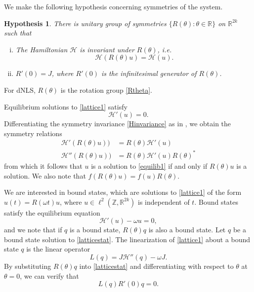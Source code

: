 \documentclass[12pt]{article}
\def\R{{\mathbb R}}
\def\Z{{\mathbb Z}}
\newtheorem{hypothesis}{Hypothesis}
\begin{document}
We make the following hypothesis concerning symmetries of the system.
\begin{hypothesis}\label{symmetryhyp}
There is unitary group of symmetries $\{ R(\theta) : \theta \in \R \}$ on $\R^{2k}$ such that 
\begin{enumerate}[(i)]
\item The Hamiltonian $\mathcal{H}$ is invariant under $R(\theta)$, i.e. 
\begin{equation}\label{Hinvariance}
\mathcal{H}(R(\theta)u) = \mathcal{H}(u).
\end{equation}
\item $R'(0) = J$, where $R'(0)$ is the infinitesimal generator of $R(\theta)$.
\end{enumerate}
\end{hypothesis}
\noindent For dNLS, $R(\theta)$ is the rotation group \eqref{Rtheta}.

Equilibrium solutions to \eqref{lattice1} satisfy 
\begin{equation}\label{equilib1}
\mathcal{H}'(u) = 0.
\end{equation}
Differentiating the symmetry invariance \eqref{Hinvariance} as in \cite{Grillakis1987}, we obtain the symmetry relations
\begin{equation}\label{symmetryrel}
\begin{aligned}
\mathcal{H}'(R(\theta)u)) &= R(\theta) \mathcal{H}'(u) \\
\mathcal{H}''(R(\theta)u)) &= R(\theta) \mathcal{H}'(u) R(\theta)^*
\end{aligned}
\end{equation}
from which it follows that $u$ is a solution to \eqref{equilib1} if and only if $R(\theta)u$ is a solution. We also note that $f(R(\theta)u) = f(u)R(\theta)$.

We are interested in bound states, which are solutions to \eqref{lattice1} of the form $u(t) = R(\omega t)u$, where $u \in \ell^2(\Z, \R^{2k})$ is independent of $t$. Bound states satisfy the equilibrium equation
\begin{equation}\label{latticestat}
\mathcal{H}'(u) - \omega u = 0,
\end{equation}
and we note that if $q$ is a bound state, $R(\theta)q$ is also a bound state. Let $q$ be a bound state solution to \eqref{latticestat}. The linearization of \eqref{lattice1} about a bound state $q$ is the linear operator
\begin{equation}\label{latticeL}
L(q) = J \mathcal{H}''(q) - \omega J.
\end{equation}
By substituting $R(\theta)q$ into \eqref{latticestat} and differentiating with respect to $\theta$ at $\theta = 0$, we can verify that 
\begin{equation}\label{Lkernel1}
L(q) R'(0) q = 0.
\end{equation}
\end{document}
